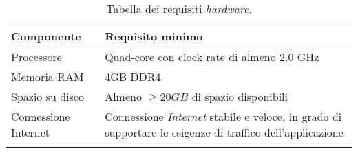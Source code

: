 \begin{longtable}{|l|p{}|}
	\hline
	\textbf{Componente}       & \textbf{ Requisito minimo}   \\
	\hline
     Processore             &  Quad-core con clock rate di almeno 2.0 GHz      \\
    \hline
     Memoria RAM            &  4GB DDR4       \\
    \hline
    Spazio su disco         &  Almeno $ \geq  20 GB$ di spazio disponibili        \\
    \hline
    Connessione Internet         & Connessione \textit{Internet} stabile e veloce, in grado di supportare le esigenze di traffico dell'applicazione         \\
    \hline

    \caption{Tabella dei requisiti \textit{hardware}.}
\end{longtable}

